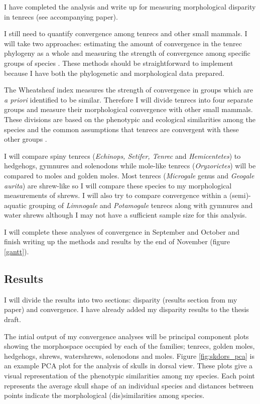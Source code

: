 \documentclass[12pt,a4paper]{article}
\begin{document}
	I have completed the analysis and write up for measuring morphological disparity in tenrecs (see accompanying paper).
	
	I still need to quantify convergence among tenrecs and other small mammals. I will take two approaches: estimating the amount of convergence in the tenrec phylogeny as a whole \citep{Stayton2008} and measuring the strength of convergence among specific groups of species \citep{Arbuckle2014}. These methods should be straightforward to implement because I have both the phylogenetic and morphological data prepared. 
	
	The Wheatsheaf index \citep{Arbuckle2014} measures the strength of convergence in groups which are \textit{a priori} identified to be similar. Therefore I will divide tenrecs into four separate groups and measure their morphological convergence with other small mammals. These divisions are based on the phenotypic and ecological similarities among the species and the common assumptions that tenrecs are convergent with these other groups \citep[e.g.][]{Soarimalala2011, Olson2013}. 
	
	I will compare spiny tenrecs (\textit{Echinops, Setifer, Tenrec} and \textit{Hemicentetes}) to hedgehogs, gymnures and solenodons while mole-like tenrecs (\textit{Oryzorictes}) will be compared to moles and golden moles. Most tenrecs (\textit{Microgale} genus and \textit{Geogale aurita}) are shrew-like so I will compare these species to my morphological measurements of shrews. I will also try to compare convergence within a (semi)-aquatic grouping of \textit{Limnogale} and \textit{Potamogale} tenrecs along with gymnures and water shrews although I may not have a sufficient sample size for this analysis. 
		
	I will complete these analyses of convergence in September and October and finish writing up the methods and results by the end of November (figure \ref{gantt}).

 
\subsection{Results}
	
	I will divide the results into two sections: disparity (results section from my paper) and convergence. I have already added my disparity results to the thesis draft.
	
	The intial output of my convergence analyses will be principal component plots showing the morphospace occupied by each of the families; tenrecs, golden moles, hedgehogs, shrews, watershrews, solenodons and moles. Figure \ref{fig:skdors_pca} is an example PCA plot for the analysis of skulls in dorsal view. These plots give a visual representation of the phenotypic similarities among my species. Each point represents the average skull shape of an individual species and distances between points indicate the morphological (dis)similarities among species.
	
\end{document}
